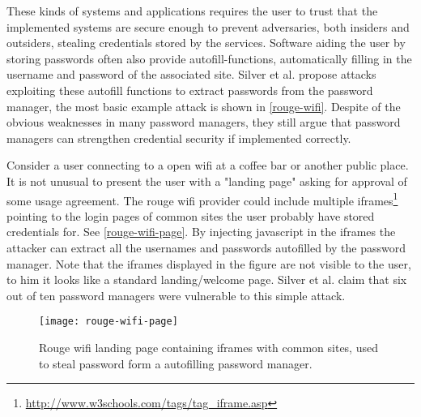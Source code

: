 These kinds of systems and applications requires the user to trust that the implemented systems are secure enough to prevent adversaries, both insiders and outsiders, stealing credentials stored by the services. Software aiding the user by storing passwords often also provide autofill-functions, automatically filling in the username and password of the associated site. Silver et al. \cite{pw-managment-attacks} propose attacks exploiting these autofill functions to extract passwords from the password manager, the most basic example attack is shown in \autoref{rouge-wifi}. Despite of the obvious weaknesses in many password managers, they still argue that password managers can strengthen credential security if implemented correctly.  
\begin{example}\label{rouge-wifi}
    Consider a user connecting to a open wifi at a coffee bar or another public place. It is not unusual to present the user with a "landing page" asking for approval of some usage agreement. The rouge wifi provider could include multiple iframes\footnote{\url{http://www.w3schools.com/tags/tag_iframe.asp}} pointing to the login pages of common sites the user probably have stored credentials for. See \autoref{rouge-wifi-page}. By injecting javascript in the iframes the attacker can extract all the usernames and passwords autofilled by the password manager. Note that the iframes displayed in the figure are not visible to the user, to him it looks like a standard landing/welcome page. Silver et al. \cite{pw-managment-attacks} claim that six out of ten password managers were vulnerable to this simple attack.


\begin{figure}
    \texttt{[image: rouge-wifi-page]}
    \caption{Rouge wifi landing page containing iframes with common sites, used to steal password form a autofilling password manager.} 
    \label{rouge-wifi-page}
\end{figure}

\end{example}

